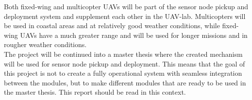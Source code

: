 \newline
Both fixed-wing and multicopter UAVs will be part of the sensor node pickup and deployment system and supplement each other in the UAV-lab. Multicopters will be used in coastal areas and at relatively good weather conditions, while fixed-wing UAVs have a much greater range and will be used for longer missions and in rougher weather conditions.\\
\newline
The project will be continued into a master thesis where the created mechanism will be used for sensor node pickup and deployment. This means that the goal of this project is not to create a fully operational system with seamless integration between the modules, but to make different modules that are ready to be used in the master thesis. This report should be read in this context.
